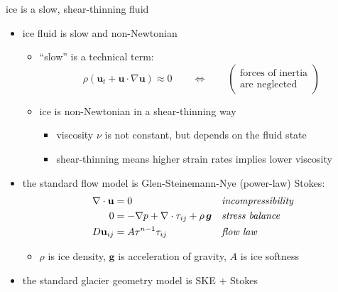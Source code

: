 \documentclass[10pt,dvipsnames]{beamer}
\begin{document}
\begin{frame}{ice is a slow, shear-thinning fluid}

\begin{itemize}
\item ice fluid is \alert{slow} and \alert{non-Newtonian}
    \begin{itemize}
    \item[$\circ$] ``slow'' is a technical term:
      $$\rho \left(\mathbf{u}_t + \mathbf{u}\cdot\nabla \mathbf{u}\right) \approx 0 \qquad \iff \qquad \begin{pmatrix} \text{forces of inertia} \\ \text{are neglected} \end{pmatrix}$$
    \item[$\circ$] ice is non-Newtonian in a shear-thinning way
        \begin{itemize}
        \item viscosity $\nu$ is not constant, but depends on the fluid state
        \item shear-thinning means higher strain rates implies lower viscosity
        \end{itemize}
    \end{itemize}

\bigskip
\item the standard flow model is \alert{Glen-Steinemann-Nye} (power-law) \alert{Stokes}:
\begin{align*}
\nabla \cdot \mathbf{u} &= 0 &&\text{\emph{incompressibility}} \\
0 &= - \nabla p + \nabla \cdot \tau_{ij} + \rho\, \bm{g} &&\text{\emph{stress balance}} \\
D\mathbf{u}_{ij} &= A \tau^{n-1} \tau_{ij} &&\text{\emph{flow law}}
\end{align*}

    \begin{itemize}
    \item[$\circ$] $\rho$ is ice density, $\bm{g}$ is acceleration of gravity, $A$ is ice softness
    \end{itemize}

\bigskip
\item the standard glacier geometry model is \alert{SKE $+$ Stokes}
\end{itemize}
\end{frame}
\end{document}

